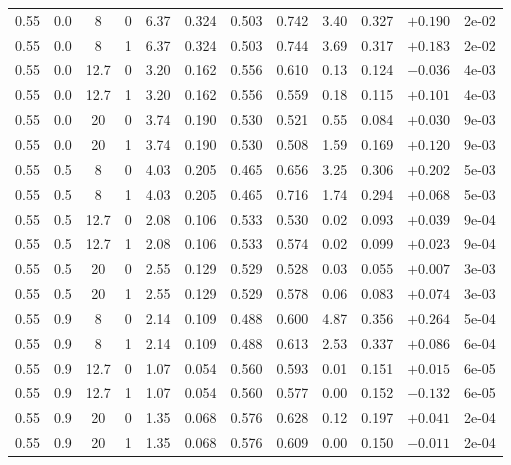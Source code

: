 \documentclass[aps,pra,onecolumn,notitlepage,superscriptaddress,nofootinbib,floatfix]{revtex4-2}
\begin{document}
\begin{table}[htbp]
\begin{tabular}{@{}cccccccccccc@{}}
0.55 & 0.0 & 8 & 0 & 6.37 & 0.324 & 0.503 & 0.742 & 3.40 & 0.327 & $+0.190$ & 2e-02 \\
0.55 & 0.0 & 8 & 1 & 6.37 & 0.324 & 0.503 & 0.744 & 3.69 & 0.317 & $+0.183$ & 2e-02 \\
0.55 & 0.0 & 12.7 & 0 & 3.20 & 0.162 & 0.556 & 0.610 & 0.13 & 0.124 & $-0.036$ & 4e-03 \\
0.55 & 0.0 & 12.7 & 1 & 3.20 & 0.162 & 0.556 & 0.559 & 0.18 & 0.115 & $+0.101$ & 4e-03 \\
0.55 & 0.0 & 20 & 0 & 3.74 & 0.190 & 0.530 & 0.521 & 0.55 & 0.084 & $+0.030$ & 9e-03 \\
0.55 & 0.0 & 20 & 1 & 3.74 & 0.190 & 0.530 & 0.508 & 1.59 & 0.169 & $+0.120$ & 9e-03 \\
0.55 & 0.5 & 8 & 0 & 4.03 & 0.205 & 0.465 & 0.656 & 3.25 & 0.306 & $+0.202$ & 5e-03 \\
0.55 & 0.5 & 8 & 1 & 4.03 & 0.205 & 0.465 & 0.716 & 1.74 & 0.294 & $+0.068$ & 5e-03 \\
0.55 & 0.5 & 12.7 & 0 & 2.08 & 0.106 & 0.533 & 0.530 & 0.02 & 0.093 & $+0.039$ & 9e-04 \\
0.55 & 0.5 & 12.7 & 1 & 2.08 & 0.106 & 0.533 & 0.574 & 0.02 & 0.099 & $+0.023$ & 9e-04 \\
0.55 & 0.5 & 20 & 0 & 2.55 & 0.129 & 0.529 & 0.528 & 0.03 & 0.055 & $+0.007$ & 3e-03 \\
0.55 & 0.5 & 20 & 1 & 2.55 & 0.129 & 0.529 & 0.578 & 0.06 & 0.083 & $+0.074$ & 3e-03 \\
0.55 & 0.9 & 8 & 0 & 2.14 & 0.109 & 0.488 & 0.600 & 4.87 & 0.356 & $+0.264$ & 5e-04 \\
0.55 & 0.9 & 8 & 1 & 2.14 & 0.109 & 0.488 & 0.613 & 2.53 & 0.337 & $+0.086$ & 6e-04 \\
0.55 & 0.9 & 12.7 & 0 & 1.07 & 0.054 & 0.560 & 0.593 & 0.01 & 0.151 & $+0.015$ & 6e-05 \\
0.55 & 0.9 & 12.7 & 1 & 1.07 & 0.054 & 0.560 & 0.577 & 0.00 & 0.152 & $-0.132$ & 6e-05 \\
0.55 & 0.9 & 20 & 0 & 1.35 & 0.068 & 0.576 & 0.628 & 0.12 & 0.197 & $+0.041$ & 2e-04 \\
0.55 & 0.9 & 20 & 1 & 1.35 & 0.068 & 0.576 & 0.609 & 0.00 & 0.150 & $-0.011$ & 2e-04 \\
\bottomrule
\end{tabular}
\end{table}
\end{document}
